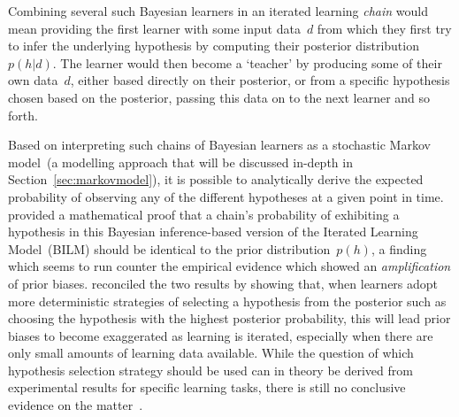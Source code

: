 Combining several such Bayesian learners in an iterated learning \emph{chain} would mean providing the first learner with some input data~$d$ from which they first try to infer the underlying hypothesis by computing their posterior distribution~$p(h|d)$. The learner would then become a `teacher' by producing some of their own data~$d$, either based directly on their posterior, or from a specific hypothesis chosen based on the posterior, passing this data on to the next learner and so forth.

Based on interpreting such chains of Bayesian learners as a stochastic Markov model~(a modelling approach that will be discussed in-depth in Section~\ref{sec:markovmodel}), it is possible to analytically derive the expected probability of observing any of the different hypotheses at a given point in time.
\citet{Griffiths2007} provided a mathematical proof that a chain's probability of exhibiting a hypothesis in this Bayesian inference-based version of the Iterated Learning Model~(BILM) should be identical to the prior distribution~$p(h)$, a finding which seems to run counter the empirical evidence which showed an \emph{amplification} of prior biases. \citet{Kirby2007} reconciled the two results by showing that, when learners adopt more deterministic strategies of selecting a hypothesis from the posterior such as choosing the hypothesis with the highest posterior probability, this will lead prior biases to become exaggerated as learning is iterated, especially when there are only small amounts of learning data available. While the question of which hypothesis selection strategy should be used can in theory be derived from experimental results for specific learning tasks, there is still no conclusive evidence on the matter~\citep{Reali2009,Ferdinand2015}.


